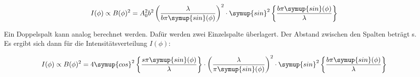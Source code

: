 \begin{equation}
  I(\phi) \propto B(\phi)^2 =
  A_0^2 b^2 \left( \frac{\lambda}{b \pi \symup{sin}(\phi)} \right)^2
  \cdot \symup{sin}^2 \left\{ \frac{b \pi \symup{sin}(\phi)}{\lambda} \right\}
  \label{eqn:Einzelspalt}
\end{equation}

Ein Doppelspalt kann analog berechnet werden.
Dafür werden zwei Einzelspalte überlagert.
Der Abstand zwischen den Spalten beträgt s.
Es ergibt sich dann für die Intensitätsverteilung $I(\phi)$:

\begin{equation}
  I(\phi) \propto B(\phi)^2 =
  4 \symup{cos}^2 \left\{ \frac{s \pi \symup{sin}(\phi)}{\lambda} \right\}
  \cdot \left( \frac{\lambda}{\pi \symup{sin}(\phi)} \right)^2
  \cdot \symup{sin}^2 \left\{ \frac{b \pi \symup{sin}(\phi)}{\lambda} \right\}
  \label{eqn:Doppelspalt}
\end{equation}

